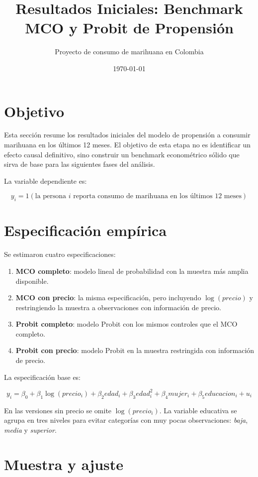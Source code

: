 \documentclass[12pt, a4paper]{article}
\title{Resultados Iniciales: Benchmark MCO y Probit de Propensión}
\author{Proyecto de consumo de marihuana en Colombia}
\date{\today}
\begin{document}
\maketitle

\section{Objetivo}

Esta sección resume los resultados iniciales del modelo de propensión a consumir marihuana en los últimos 12 meses. El objetivo de esta etapa no es identificar un efecto causal definitivo, sino construir un benchmark econométrico sólido que sirva de base para las siguientes fases del análisis.

La variable dependiente es:

\[
    y_i = 1(\text{la persona } i \text{ reporta consumo de marihuana en los últimos 12 meses})
\]

\section{Especificación empírica}

Se estimaron cuatro especificaciones:

\begin{enumerate}
    \item \textbf{MCO completo}: modelo lineal de probabilidad con la muestra más amplia disponible.
    \item \textbf{MCO con precio}: la misma especificación, pero incluyendo \(\log(precio)\) y restringiendo la muestra a observaciones con información de precio.
    \item \textbf{Probit completo}: modelo Probit con los mismos controles que el MCO completo.
    \item \textbf{Probit con precio}: modelo Probit en la muestra restringida con información de precio.
\end{enumerate}

La especificación base es:

\[
    y_i = \beta_0 + \beta_1 \log(precio_i) + \beta_2 edad_i + \beta_3 edad_i^2 + \beta_4 mujer_i + \beta_5 educacion_i + u_i
\]

En las versiones sin precio se omite \(\log(precio_i)\). La variable educativa se agrupa en tres niveles para evitar categorías con muy pocas observaciones: \textit{baja}, \textit{media} y \textit{superior}.

\section{Muestra y ajuste}
\end{document}
